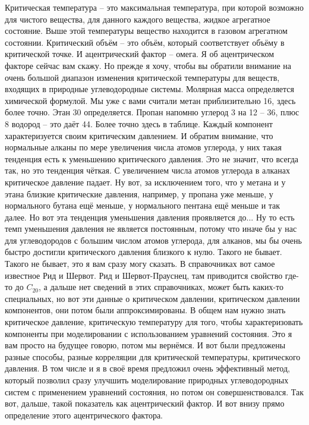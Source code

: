 \documentclass[main.tex]{subfiles}
\begin{document}
Критическая температура -- это максимальная температура, при которой возможно для чистого вещества, для данного каждого вещества, жидкое агрегатное состояние.
Выше этой температуры вещество находится в газовом агрегатном состоянии.
Критический объём -- это объём, который соответствует объёму в критической точке.
И ацентрический фактор -- омега.
Я об ацентрическом факторе сейчас вам скажу.
Но прежде я хочу, чтобы вы обратили внимание на очень большой диапазон изменения критической температуры для веществ, входящих в природные углеводородные системы.
Молярная масса определяется химической формулой.
Мы уже с вами считали метан приблизительно 16, здесь более точно.
Этан 30 определяется.
Пропан напомню углерод 3 на 12 -- 36, плюс 8 водород -- это даёт 44.
Более точно здесь в таблице.
Каждый компонент характеризуется своим критическим давлением.
И обратим внимание, что нормальные алканы по мере увеличения числа атомов углерода, у них такая тенденция есть к уменьшению критического давления.
Это не значит, что всегда так, но это тенденция чёткая.
С увеличением числа атомов углерода в алканах критическое давление падает.
Ну вот, за исключением того, что у метана и у этана близкие критические давления, например, у пропана уже меньше, у нормального бутана ещё меньше, у нормального пентана ещё меньше и так далее.
Но вот эта тенденция уменьшения давления проявляется до...
Ну то есть темп уменьшения давления не является постоянным, потому что иначе бы у нас для углеводородов с большим числом атомов углерода, для алканов, мы бы очень быстро достигли критического давления близкого к нулю.
Такого не бывает.
Такого не бывает, это я вам сразу могу сказать.
В справочниках вот самое известное Рид и Шервот.
Рид и Шервот-Прауснец, там приводится свойство где-то до $C_{20}$, а дальше нет сведений в этих справочниках, может быть каких-то специальных, но вот эти данные о критическом давлении, критическом давлении компонентов, они потом были аппроксимированы.
В общем нам нужно знать критическое давление, критическую температуру для того, чтобы характеризовать компоненты при моделировании с использованием уравнений состояния.
Это я вам просто на будущее говорю, потом мы вернёмся.
И вот были предложены разные способы, разные корреляции для критической температуры, критического давления.
В том числе и я в своё время предложил очень эффективный метод, который позволил сразу улучшить моделирование природных углеводородных систем с применением уравнений состояния, но потом он совершенствовался.
Так вот, дальше, такой показатель как ацентрический фактор.
И вот внизу прямо определение этого ацентрического фактора.
\end{document}
